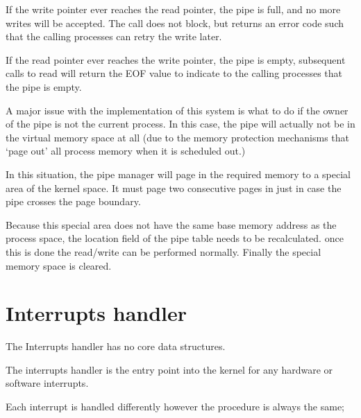 \documentclass[a4paper]{report}
\begin{document}
If the write pointer ever reaches the read pointer, the pipe is full, and no more writes will be accepted. The call does not block, but returns an error code such that the calling processes can retry the write later.

If the read pointer ever reaches the write pointer, the pipe is empty, subsequent calls to read will return the EOF value to indicate to the calling processes that the pipe is empty.

A major issue with the implementation of this system is what to do if the owner of the pipe is not the current process. In this case, the pipe will actually not be in the virtual memory space at all (due to the memory protection mechanisms that `page out' all process memory when it is scheduled out.)

In this situation, the pipe manager will page in the required memory to a special area of the kernel space. It must page two consecutive pages in just in case the pipe crosses the page boundary.

Because this special area does not have the same base memory address as the process space, the location field of the pipe table needs to be recalculated. once this is done the read/write can be performed normally. Finally the special memory space is cleared.











\section{Interrupts handler}

The Interrupts handler has no core data structures.

The interrupts handler is the entry point into the kernel for any hardware or software interrupts.

Each interrupt is handled differently however the procedure is always the same;
\end{document}
